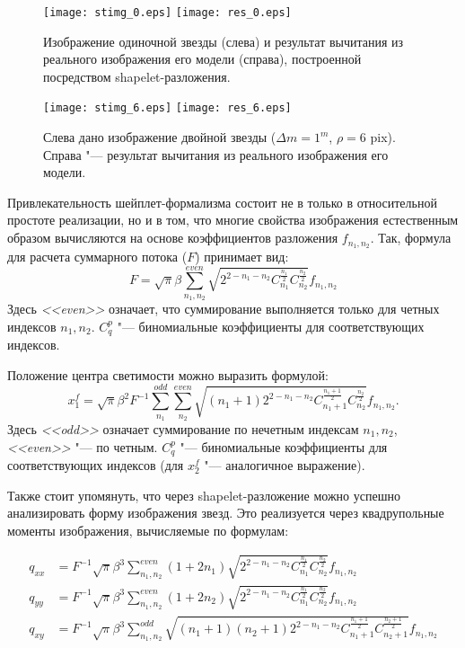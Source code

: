 \begin{figure}
\centering
\texttt{[image: stimg\_0.eps]}
\texttt{[image: res\_0.eps]}
\caption{Изображение одиночной звезды (слева) и результат вычитания из реального изображения его модели (справа), построенной посредством shapelet-разложения.}
\label{fig:model-stars}
\end{figure}

\begin{figure}
\centering
\texttt{[image: stimg\_6.eps]}
\texttt{[image: res\_6.eps]}
\caption{Слева дано изображение двойной звезды ($\Delta m=1^m$, $\rho=6$ pix). Справа "--- результат вычитания из реального изображения его модели.}
\label{fig:model-bin-stars}
\end{figure}

Привлекательность шейплет-формализма состоит не в только в относительной простоте реализации, но и в том, что многие свойства изображения естественным образом вычисляются на основе коэффициентов разложения $f_{n_1,n_2}$. Так, формула для расчета суммарного потока ($F$) принимает вид:
\begin{equation}
\label{eq:SHFlux}
 F = \sqrt{\pi} \beta \sum^{even}_{n_1,n_2} \sqrt{2^{2-n_1-n_2}C^{\frac{n_1}{2}}_{n_1}C^{\frac{n_2}{2}}_{n_2}}f_{n_1,n_2}
\end{equation}
Здесь \textit{<<even>>} означает, что суммирование выполняется только для четных индексов $n_1,n_2$. $C^{p}_{q}$ "--- биномиальные коэффициенты для соответствующих индексов.

Положение центра светимости можно выразить формулой:
\begin{equation}
\label{eq:SHPhCent}
x_1^f = \sqrt{\pi} \beta^2 F^{-1} \sum^{odd}_{n_1}\sum^{even}_{n_2} \sqrt{
(n_1+1)2^{2-n_1-n_2}C^{\frac{n_1+1}{2}}_{n_1+1}C^{\frac{n_2}{2}}_{n_2}}f_{n_1,n_2}.
\end{equation}
Здесь \textit{<<odd>>} означает суммирование по нечетным индексам $n_1,n_2$, \textit{<<even>>} "--- по четным. $C^{p}_{q}$ "--- биномиальные коэффициенты для соответствующих индексов (для $x_2^f$ "--- аналогичное выражение).

Также стоит упомянуть, что через shapelet-разложение можно успешно анализировать форму изображения звезд. Это реализуется через квадрупольные моменты изображения,  вычисляемые по формулам:

\begin{align}\label{moments}
 q_{xx} & = F^{-1} \sqrt{\pi} \beta^3 \sum^{even}_{n_1,n_2} (1+2n_1) \sqrt{2^{2-n_1-n_2}C^{\frac{n_1}{2}}_{n_1}C^{\frac{n_2}{2}}_{n_2}}f_{n_1,n_2} \\
 q_{yy} & = F^{-1} \sqrt{\pi} \beta^3 \sum^{even}_{n_1,n_2} (1+2n_2) \sqrt{2^{2-n_1-n_2}C^{\frac{n_1}{2}}_{n_1}C^{\frac{n_2}{2}}_{n_2}}f_{n_1,n_2} \\
 q_{xy} & = F^{-1} \sqrt{\pi} \beta^3 \sum^{odd}_{n_1,n_2} \sqrt{(n_1+1)(n_2+1)2^{2-n_1-n_2}C^{\frac{n_1+1}{2}}_{n_1+1}C^{\frac{n_2+1}{2}}_{n_2+1}}f_{n_1,n_2}
\end{align}

